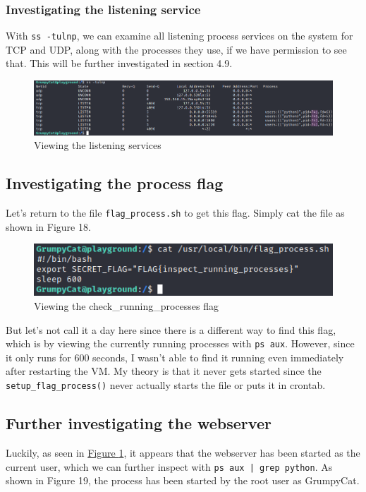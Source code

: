 \documentclass[a4paper]{article}
\newcommand{\abc}{\hfill \break}
\begin{document}
\subsubsection{Investigating the listening service}
With \texttt{ss -tulnp}, we can examine all listening process services on the system for TCP and UDP, along with the processes they use, if we have permission to see that. This will be further investigated in section 4.9.
\begin{figure}[h]
	\includegraphics[scale=0.35]{images/sstunlp.png}
	\centering
	\caption{Viewing the listening services}
	\label{fig:sstunlp}
\end{figure}\abc
\newpage
\subsection{Investigating the process flag}
Let's return to the file \texttt{flag\_process.sh} to get this flag. Simply cat the file as shown in Figure 18.
\begin{figure}[ht]
	\includegraphics[scale=0.55]{images/processflag.png}
	\centering
	\caption{Viewing the check\_running\_processes flag}
\end{figure}\abc
But let's not call it a day here since there is a different way to find this flag, which is by viewing the currently running processes with \texttt{ps aux}. However, since it only runs for 600 seconds, I wasn't able to find it running even immediately after restarting the VM. My theory is that it never gets started since the \texttt{setup\_flag\_process()} never actually starts the file or puts it in crontab.

\subsection{Further investigating the webserver}
Luckily, as seen in \textcolor{blue}{\hyperref[fig:sstunlp]{Figure \ref{fig:sstunlp}}}, it appears that the webserver has been started as the current user, which we can further inspect with \texttt{ps aux | grep python}. As shown in Figure 19, the process has been started by the root user as GrumpyCat.
\end{document}

